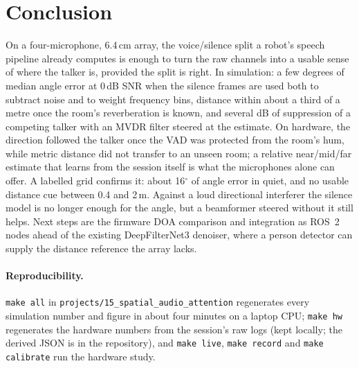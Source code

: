 \section{Conclusion}

On a four-microphone, 6.4\,cm array, the voice/silence split a robot's
speech pipeline already computes is enough to turn the raw channels into
a usable sense of where the talker is, provided the split is right. In
simulation: a few degrees of median angle error at 0\,dB SNR when the
silence frames are used both to subtract noise and to weight frequency
bins, distance within about a third of a metre once the room's
reverberation is known, and several dB of suppression of a competing
talker with an MVDR filter steered at the estimate. On hardware, the
direction followed the talker once the VAD was protected from the room's
hum, while metric distance did not transfer to an unseen room; a relative
near/mid/far estimate that learns from the session itself is what the
microphones alone can offer. A labelled grid confirms it: about
16$^\circ$ of angle error in quiet, and no usable distance cue between 0.4
and 2\,m. Against a loud directional interferer the silence model is no
longer enough for the angle, but a beamformer steered without it still
helps. Next steps are the firmware DOA comparison and integration as ROS~2
nodes ahead of the existing DeepFilterNet3 denoiser, where a person detector
can supply the distance reference the array lacks.

\paragraph{Reproducibility.} \texttt{make all} in
\texttt{projects/15\_spatial\_audio\_attention} regenerates every
simulation number and figure in about four minutes on a laptop CPU;
\texttt{make hw} regenerates the hardware numbers from the session's raw
logs (kept locally; the derived JSON is in the repository), and
\texttt{make live}, \texttt{make record} and \texttt{make calibrate} run
the hardware study.
